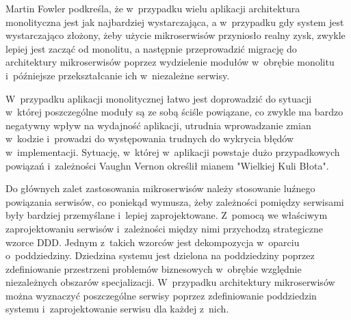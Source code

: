 \par
Martin Fowler podkreśla, że w~przypadku wielu aplikacji architektura monolityczna jest jak najbardziej wystarczająca,
a w~przypadku gdy system jest wystarczająco złożony, żeby użycie mikroserwisów przyniosło realny zysk, zwykle lepiej jest zacząć od monolitu,
a następnie przeprowadzić migrację do architektury mikroserwisów poprzez wydzielenie modułów w~obrębie monolitu
i~późniejsze przekształcanie ich w~niezależne serwisy\cite{url:monolith-first}.

\par
W~przypadku aplikacji monolitycznej łatwo jest doprowadzić do sytuacji w~której poszczególne moduły są ze sobą ściśle powiązane,
co zwykle ma bardzo negatywny wpływ na wydajność aplikacji, utrudnia wprowadzanie zmian w~kodzie i~prowadzi do występowania trudnych do wykrycia błędów w~implementacji.
Sytuację, w~której w~aplikacji powstaje dużo przypadkowych powiązań i~zależności Vaughn Vernon określił mianem "Wielkiej Kuli Błota"\cite{book:ddd-kompendium}.

\par
Do głównych zalet zastosowania mikroserwisów należy stosowanie luźnego powiązania serwisów,
co poniekąd wymusza, żeby zależności pomiędzy serwisami były bardziej przemyślane i~lepiej zaprojektowane.
Z~pomocą we właściwym zaprojektowaniu serwisów i~zależności między nimi przychodzą strategiczne wzorce DDD.
Jednym z~takich wzorców jest dekompozycja w~oparciu o~poddziedziny\cite{book:ddd-evans}.
Dziedzina systemu jest dzielona na poddziedziny poprzez zdefiniowanie przestrzeni problemów biznesowych w~obrębie względnie niezależnych obszarów specjalizacji.
W~przypadku architektury mikroserwisów można wyznaczyć poszczególne serwisy poprzez zdefiniowanie poddziedzin systemu
i~zaprojektowanie serwisu dla każdej z~nich\cite{book:microservices-patterns}.

\thispagestyle{normal}
